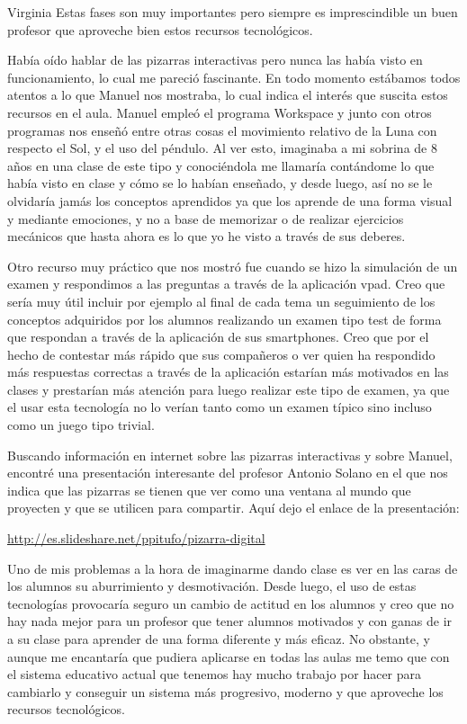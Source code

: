 \begin{opin}{\virgicolor}{Virginia}
Estas fases son muy importantes pero siempre es imprescindible un buen profesor que aproveche bien estos recursos tecnológicos.

Había oído hablar de las pizarras interactivas pero nunca las había visto en funcionamiento, lo cual me pareció fascinante. En todo momento estábamos todos atentos a lo que Manuel nos mostraba, lo cual indica el interés que suscita estos recursos en el aula. Manuel empleó el programa Workspace y junto con otros programas nos enseñó entre otras cosas el movimiento relativo de la Luna con respecto el Sol, y el uso del péndulo. Al ver esto, imaginaba a mi sobrina de 8 años en una clase de este tipo y conociéndola me llamaría contándome lo que había visto en clase y cómo se lo habían enseñado, y desde luego, así no se le olvidaría jamás los conceptos aprendidos ya que los aprende de una forma visual y mediante emociones, y no a base de memorizar o de realizar ejercicios mecánicos que hasta ahora es lo que yo he visto a través de sus deberes.

Otro recurso muy práctico que nos mostró fue cuando se hizo la simulación de un examen y respondimos a las preguntas a través de la aplicación vpad. Creo que sería muy útil incluir por ejemplo al final de cada tema un seguimiento de los conceptos adquiridos por los alumnos realizando un examen tipo test de forma que respondan a través de la aplicación de sus smartphones. Creo que por el hecho de contestar más rápido que sus compañeros o ver quien ha respondido más respuestas correctas a través de la aplicación estarían más motivados en las clases y prestarían más atención para luego realizar este tipo de examen, ya que el usar esta tecnología no lo verían tanto como un examen típico sino incluso como un juego tipo trivial.

Buscando información en internet sobre las pizarras interactivas y sobre Manuel, encontré una presentación interesante del profesor Antonio Solano en el que nos indica que las pizarras se tienen que ver como una ventana al mundo que proyecten y que se utilicen para compartir. Aquí dejo el enlace de la presentación:

 \url{http://es.slideshare.net/ppitufo/pizarra-digital}

Uno de mis problemas a la hora de imaginarme dando clase es ver en las caras de los alumnos su aburrimiento y desmotivación. Desde luego, el uso de estas tecnologías provocaría seguro un cambio de actitud en los alumnos y creo que no hay nada mejor para un profesor que tener alumnos motivados y con ganas de ir a su clase para aprender de una forma diferente y más eficaz. No obstante, y aunque me encantaría que pudiera aplicarse en todas las aulas me temo que con el sistema educativo actual que tenemos hay mucho trabajo por hacer para cambiarlo y conseguir un sistema más progresivo, moderno y que aproveche los recursos tecnológicos.


\end{opin}

